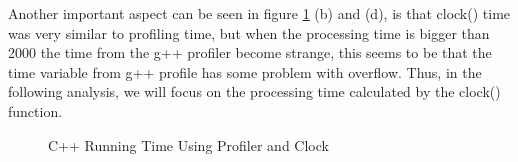 \documentclass[12pt]{article}
\begin{document}
Another important aspect can be seen in figure \ref{fig:cpptime} (b) and (d), is that clock() time was very similar to profiling time, but when the processing time is bigger than 2000 the time from the g++ profiler become strange,  this seems to be that the time variable from g++ profile has some problem with overflow. Thus, in the following analysis, we will focus on the processing time calculated by the clock() function.
\begin{figure}[H]
    \centering
    

    \caption{C++ Running Time Using Profiler and Clock} 
    \label{fig:cpptime}
\end{figure}
\end{document}
